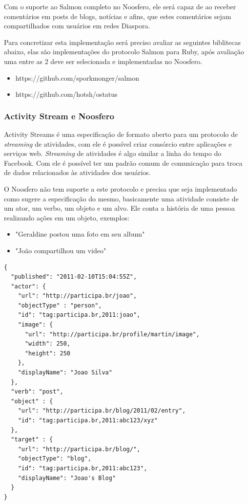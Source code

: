 \documentclass[12pt]{article}
\begin{document}
Com o suporte ao Salmon completo no Noosfero, ele será capaz de ao
receber comentários em posts de blogs, notícias e afins, que estes comentários
sejam compartilhados com usuários em redes Diaspora.

Para concretizar esta implementação será preciso avaliar as seguintes
biblitecas abaixo, elas são implementações do protocolo Salmon para Ruby, após
avaliação uma entre as 2 deve ser selecionada e implementadas no Noosfero.

\begin{itemize}
  \item https://github.com/sporkmonger/salmon
  \item https://github.com/hotsh/ostatus
\end{itemize}

\subsubsection{Activity Stream e Noosfero}

Activity Streams é uma especificação de formato aberto para um protocolo de
{\it streaming} de atividades, com ele é possível criar consórcio entre
aplicações e serviços web. {\it Streaming} de atividades é algo similar a
linha do tempo do Facebook. Com ele é possível ter um padrão comum de
comunicação para troca de dados relacionados às atividades dos usuários.

O Noosfero não tem suporte a este protocolo e precisa que seja implementado
como sugere a especificação do mesmo, basicamente uma atividade consiste de um
ator, um verbo, um objeto e um alvo. Ele conta a história de uma pessoa
realizando ações em um objeto, exemplos\cite{streams}:

\begin{itemize}
  \item "Geraldine postou uma foto em seu album"
  \item "João compartilhou um video"
\end{itemize}

\begin{framed}
\begin{lstlisting}[caption=Exemplo simples de atividade JSON serializada]
{
  "published": "2011-02-10T15:04:55Z",
  "actor": {
    "url": "http://participa.br/joao",
    "objectType" : "person",
    "id": "tag:participa.br,2011:joao",
    "image": {
      "url": "http://participa.br/profile/martin/image",
      "width": 250,
      "height": 250
    },
    "displayName": "Joao Silva"
  },
  "verb": "post",
  "object" : {
    "url": "http://participa.br/blog/2011/02/entry",
    "id": "tag:participa.br,2011:abc123/xyz"
  },
  "target" : {
    "url": "http://participa.br/blog/",
    "objectType": "blog",
    "id": "tag:participa.br,2011:abc123",
    "displayName": "Joao's Blog"
  }
}
\end{lstlisting}
\end{framed}
\end{document}
